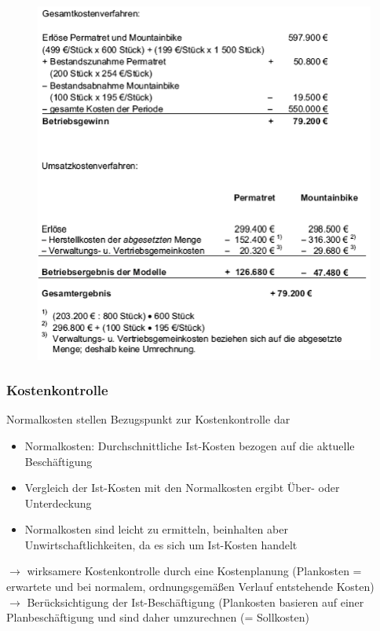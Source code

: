 \documentclass[a4paper,11pt, twoside]{article}
\begin{document}
\begin{figure}[h]
 \begin{center}
   \includegraphics[scale=0.5]{bilder/beispiel_betriebsergebnisrechnung2.png}
 \end{center}
\end{figure}

\subsubsection*{Kostenkontrolle}
Normalkosten stellen Bezugspunkt zur Kostenkontrolle dar
\begin{itemize}
	\item Normalkosten: Durchschnittliche Ist-Kosten bezogen auf die aktuelle Beschäftigung
	\item Vergleich der Ist-Kosten mit den Normalkosten ergibt Über- oder Unterdeckung
	\item Normalkosten sind leicht zu ermitteln, beinhalten aber Unwirtschaftlichkeiten, da es sich um Ist-Kosten handelt
\end{itemize}
$\rightarrow$ wirksamere Kostenkontrolle durch eine Kostenplanung (Plankosten = erwartete und bei normalem, ordnungsgemäßen Verlauf entstehende Kosten)\\
$\rightarrow$ Berücksichtigung der Ist-Beschäftigung (Plankosten basieren auf einer Planbeschäftigung und sind daher umzurechnen (= Sollkosten)
\end{document}
